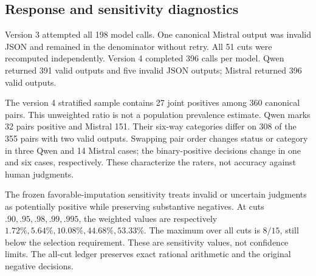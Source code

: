 \subsection{Response and sensitivity diagnostics}
Version 3 attempted all 198 model calls. One canonical Mistral output was
invalid JSON and remained in the denominator without retry. All 51 cuts
were recomputed independently. Version 4 completed 396 calls per model.
Qwen returned 391 valid outputs and five invalid JSON outputs; Mistral
returned 396 valid outputs.

The version 4 stratified sample contains 27 joint positives among 360
canonical pairs. This unweighted ratio is not a population prevalence
estimate. Qwen marks 32 pairs positive and Mistral 151. Their six-way
categories differ on 308 of the 355 pairs with two valid outputs. Swapping
pair order changes status or category in three Qwen and 14 Mistral cases;
the binary-positive decisions change in one and six cases, respectively.
These characterize the raters, not accuracy against human judgments.

The frozen favorable-imputation sensitivity treats invalid or uncertain
judgments as potentially positive while preserving substantive negatives.
At cuts $.90,.95,.98,.99,.995$, the weighted values are respectively
$1.72\%,5.64\%,10.08\%,44.68\%,53.33\%$. The maximum over all cuts is
$8/15$, still below the selection requirement. These are sensitivity
values, not confidence limits. The all-cut ledger preserves exact
rational arithmetic and the original negative decisions.


